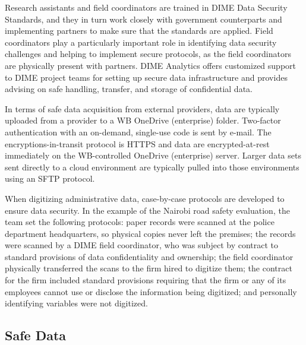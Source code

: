 Research assistants and field coordinators are trained in DIME Data Security Standards, and they in turn work closely with government counterparts and implementing partners to make sure that the standards are applied. Field coordinators play a particularly important role in identifying data security challenges and helping to implement secure protocols, as the field coordinators are physically present with partners. DIME Analytics offers customized support to DIME project teams for setting up secure data infrastructure and provides advising on safe handling, transfer, and storage of confidential data.

In terms of safe data acquisition from external providers, data are typically uploaded from a provider to a WB OneDrive (enterprise) folder. Two-factor authentication with an on-demand, single-use code is sent by e-mail. The encryptions-in-transit protocol is HTTPS and data are encrypted-at-rest immediately on the WB-controlled OneDrive (enterprise) server. Larger data sets sent directly to a cloud environment are typically pulled into those environments using an SFTP protocol.

When digitizing administrative data, case-by-case protocols are developed to ensure data security. In the example of the Nairobi road safety evaluation, the team set the following protocols: paper records were scanned at the police department headquarters, so physical copies never left the premises; the records were scanned by a DIME field coordinator, who was subject by contract to standard provisions of data confidentiality and ownership; the field coordinator physically transferred the scans to the firm hired to digitize them; the contract for the firm included standard provisions requiring that the firm or any of its employees cannot use or disclose the information being digitized; and personally identifying variables were not digitized.

\hypertarget{safe-data-6}{%
\subsection{Safe Data}\label{safe-data-6}}

